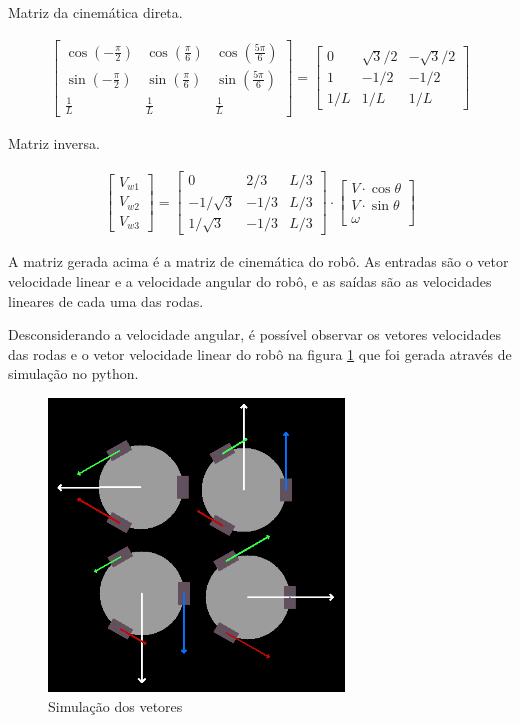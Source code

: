 Matriz da cinemática direta.

\begin{gather}
	\begin{bmatrix}
		\cos{\left(-\frac{\pi}{2}\right)} & \cos{\left(\frac{\pi}{6}\right)} & \cos{\left(\frac{5\pi}{6}\right)} \\
		\sin{\left(-\frac{\pi}{2}\right)} & \sin{\left(\frac{\pi}{6}\right)} & \sin{\left(\frac{5\pi}{6}\right)} \\
		\frac{1}{L} & \frac{1}{L} & \frac{1}{L}
	\end{bmatrix}
	=
	\begin{bmatrix}
		0 & \sqrt{3}/2 & -\sqrt{3}/2 \\
		1 & -1/2 & -1/2  \\
		1/L & 1/L & 1/L
	\end{bmatrix}
\end{gather}



Matriz inversa.


\begin{gather}
	\begin{bmatrix} V_{w1} \\  V_{w2} \\  V_{w3} \end{bmatrix}
	=
	\begin{bmatrix}
		0 & 2/3 & L/3 \\
		-1/\sqrt{3} & -1/3 & L/3\\
		1/\sqrt{3} & -1/3 & L/3
	\end{bmatrix}
	\cdot
	\begin{bmatrix} V\cdot \cos{\theta} \\  V\cdot \sin{\theta} \\  \omega \end{bmatrix}
\end{gather}


A matriz gerada acima é a matriz de cinemática do robô.
As entradas são o vetor velocidade linear e a velocidade angular do robô, e as saídas são as velocidades lineares de cada uma das rodas.

Desconsiderando a velocidade angular, é possível observar os vetores velocidades das rodas e o vetor velocidade linear do robô na figura \ref{simulacao} que foi gerada através de simulação no python.

\begin{figure}[h]
	\centering
	\includegraphics[width=0.7\textwidth]{figures/simulacao}
	\caption{Simulação dos vetores}
	\label{simulacao}
\end{figure}
